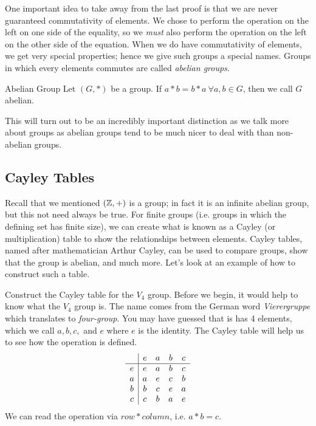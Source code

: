 One important idea to take away from the last proof is that we are never guaranteed commutativity of elements.
We chose to perform the operation on the left on one side of the equality, so we \textit{must} also perform the operation on the left on the other side of the equation.
When we do have commutativity of elements, we get very special properties; hence we give such groups a special names.
Groups in which every elements commutes are called \textit{abelian groups}.
\begin{definition}{Abelian Group}
	Let $(G,*)$ be a group. If $a*b=b*a\ \forall a,b\in G$, then we call $G$ abelian.
\end{definition}
This will turn out to be an incredibly important distinction as we talk more about groups as abelian groups tend to be much nicer to deal with than non-abelian groups.

\subsection*{Cayley Tables}
Recall that we mentioned $(\mathbb{Z},+)$ is a group; in fact it is an infinite abelian group, but this not need always be true.
For finite groups (i.e. groups in which the defining set has finite size), we can create what is known as a Cayley (or multiplication) table to show the relationships between elements.
Cayley tables, named after mathematician Arthur Cayley, can be used to compare groups, show that the group is abelian, and much more.
Let's look at an example of how to construct such a table.

\begin{example}{Construct the Cayley table for the $V_{4}$ group.}
	Before we begin, it would help to know what the $V_{4}$ group is.
	The name comes from the German word \textit{Vierergruppe} which translates to \textit{four-group}.
	You may have guessed that is has 4 elements, which we call $a,b,c,$ and $e$ where $e$ is the identity.
	The Cayley table will help us to see how the operation is defined.
	\[
		\begin{array}{c | c c c c}
			& e & a & b & c\\
			\hline
			e & e & a & b & c\\
			a & a & e & c & b\\
			b & b & c & e & a\\
			c & c & b & a & e
		\end{array}
	\]
	We can read the operation via $row * column$, i.e. $a * b=c$.
\end{example}

